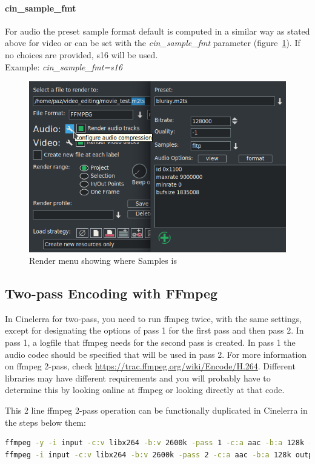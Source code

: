\paragraph{cin\_sample\_fmt} For audio the preset sample format default is computed in a similar way as stated above for video or can be set with the \textit{cin\_sample\_fmt} parameter (figure~\ref{fig:audio}).  If no choices are provided, s16 will be used.\\
Example: \textit{cin\_sample\_fmt=s16}

\begin{figure}[htpb]
    \centering
    \includegraphics[width=0.55\linewidth]{images/audio.png}
    \caption{Render menu showing where Samples is}
    \label{fig:audio}
\end{figure}

\subsection{Two-pass Encoding with FFmpeg}%
\label{sub:two_pass_encoding_ffmpeg}

In Cinelerra for two-pass, you need to run ffmpeg twice, with the same settings, except for designating the options of pass 1 for the first pass and then pass 2.  In pass 1, a logfile that ffmpeg needs for the second pass is created.  In pass 1 the audio codec should be specified that will be used in pass 2.  For more information on ffmpeg 2-pass, check {\small \url{https://trac.ffmpeg.org/wiki/Encode/H.264}}.  Different libraries may have different requirements and you will probably have to determine this by looking online at ffmpeg or looking directly at that code.

This 2 line ffmpeg 2-pass operation can be functionally duplicated in Cinelerra in the steps below them:

\begin{lstlisting}[language=bash,numbers=none]
ffmpeg -y -i input -c:v libx264 -b:v 2600k -pass 1 -c:a aac -b:a 128k -f mp4 /dev/null && \
ffmpeg -i input -c:v libx264 -b:v 2600k -pass 2 -c:a aac -b:a 128k output.mp4
\end{lstlisting}

